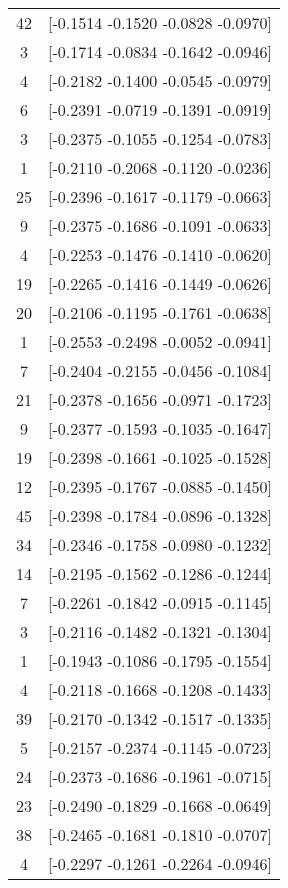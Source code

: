 \documentclass[12pt, fullpage,letterpaper]{article}
\begin{document}
\begin{enumerate}
\begin{enumerate}
{\begin{longtable}{|c|c|}
			 42 &  [-0.1514 -0.1520 -0.0828 -0.0970] \\
			  3 &  [-0.1714 -0.0834 -0.1642 -0.0946] \\
			  4 &  [-0.2182 -0.1400 -0.0545 -0.0979] \\
			  6 &  [-0.2391 -0.0719 -0.1391 -0.0919] \\
			  3 &  [-0.2375 -0.1055 -0.1254 -0.0783] \\
			  1 &  [-0.2110 -0.2068 -0.1120 -0.0236] \\
			 25 &  [-0.2396 -0.1617 -0.1179 -0.0663] \\
			  9 &  [-0.2375 -0.1686 -0.1091 -0.0633] \\
			  4 &  [-0.2253 -0.1476 -0.1410 -0.0620] \\
			 19 &  [-0.2265 -0.1416 -0.1449 -0.0626] \\
			 20 &  [-0.2106 -0.1195 -0.1761 -0.0638] \\
			  1 &  [-0.2553 -0.2498 -0.0052 -0.0941] \\
			  7 &  [-0.2404 -0.2155 -0.0456 -0.1084] \\
			 21 &  [-0.2378 -0.1656 -0.0971 -0.1723] \\
			  9 &  [-0.2377 -0.1593 -0.1035 -0.1647] \\
			 19 &  [-0.2398 -0.1661 -0.1025 -0.1528] \\
			 12 &  [-0.2395 -0.1767 -0.0885 -0.1450] \\
			 45 &  [-0.2398 -0.1784 -0.0896 -0.1328] \\
			 34 &  [-0.2346 -0.1758 -0.0980 -0.1232] \\
			 14 &  [-0.2195 -0.1562 -0.1286 -0.1244] \\
			  7 &  [-0.2261 -0.1842 -0.0915 -0.1145] \\
			  3 &  [-0.2116 -0.1482 -0.1321 -0.1304] \\
			  1 &  [-0.1943 -0.1086 -0.1795 -0.1554] \\
			  4 &  [-0.2118 -0.1668 -0.1208 -0.1433] \\
			 39 &  [-0.2170 -0.1342 -0.1517 -0.1335] \\
			  5 &  [-0.2157 -0.2374 -0.1145 -0.0723] \\
			 24 &  [-0.2373 -0.1686 -0.1961 -0.0715] \\
			 23 &  [-0.2490 -0.1829 -0.1668 -0.0649] \\
			 38 &  [-0.2465 -0.1681 -0.1810 -0.0707] \\
			  4 &  [-0.2297 -0.1261 -0.2264 -0.0946] \\

\end{longtable}}
\end{enumerate}
\end{enumerate}
\end{document}

